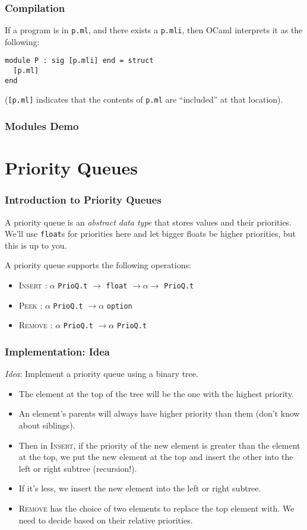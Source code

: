 \documentclass{beamer}
\begin{document}
\begin{frame}[fragile]
\frametitle{Compilation}
If a program is in \verb|p.ml|, and there exists a \verb|p.mli|, then OCaml interprets it as the following:
\begin{lstlisting}
module P : sig [p.mli] end = struct
  [p.ml]
end
\end{lstlisting}

(\verb|[p.ml]| indicates that the contents of \verb|p.ml| are ``included'' at that location).
\end{frame}

\begin{frame}
\frametitle{Modules Demo}
\begin{center}
{\huge \smiley{}}
\end{center}
\end{frame}

\section{Priority Queues}

\begin{frame}[fragile]
\frametitle{Introduction to Priority Queues}
A priority queue is an \textit{abstract data type} that stores values and their priorities.
We'll use \verb|float|s for priorities here and let bigger floats be higher priorities, but this is up to you.

A priority queue supports the following operations:
\begin{itemize}
\item \textsc{Insert} : $\alpha$ \verb|PrioQ.t| $\rightarrow$ \verb|float| $\rightarrow \alpha \rightarrow$ \verb|PrioQ.t|
\item \textsc{Peek} : $\alpha$ \verb|PrioQ.t| $\rightarrow \alpha$ \verb|option|
\item \textsc{Remove} : $\alpha$ \verb|PrioQ.t| $\rightarrow \alpha$ \verb|PrioQ.t|
\end{itemize}
\end{frame}

\begin{frame}[fragile]
\frametitle{Implementation: Idea}
\textit{Idea}: Implement a priority queue using a binary tree.
\begin{itemize}
\item The element at the top of the tree will be the one with the highest priority.
\item An element's parents will always have higher priority than them (don't know about siblings). \pause
\item Then in \textsc{Insert}, if the priority of the new element is greater than the element at the top, we put the new element at the top and insert the other into the left or right subtree (recursion!).
\item If it's less, we insert the new element into the left or right subtree. \pause
\item \textsc{Remove} has the choice of two elements to replace the top element with. We need to decide based on their relative priorities.
\end{itemize}
\end{frame}
\end{document}
